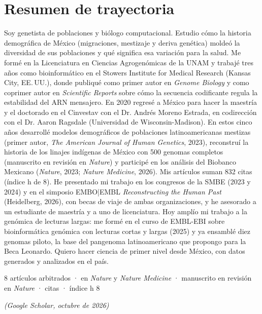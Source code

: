 \documentclass[11pt,letterpaper]{article}
\begin{document}
\section*{Resumen de trayectoria}
\begin{resumen}
Soy genetista de poblaciones y biólogo computacional. Estudio cómo la historia demográfica de México (migraciones, mestizaje y deriva genética) moldeó la diversidad de sus poblaciones y qué significa esa variación para la salud. Me formé en la Licenciatura en Ciencias Agrogenómicas de la UNAM y trabajé tres años como bioinformático en el Stowers Institute for Medical Research (Kansas City, EE.\,UU.), donde publiqué como primer autor en \textit{Genome Biology} y como coprimer autor en \textit{Scientific Reports} sobre cómo la secuencia codificante regula la estabilidad del ARN mensajero. En 2020 regresé a México para hacer la maestría y el doctorado en el Cinvestav con el Dr. Andrés Moreno Estrada, en codirección con el Dr. Aaron Ragsdale (Universidad de Wisconsin-Madison). En estos cinco años desarrollé modelos demográficos de poblaciones latinoamericanas mestizas (primer autor, \textit{The American Journal of Human Genetics}, 2023), reconstruí la historia de los linajes indígenas de México con 500 genomas completos (manuscrito en revisión en \textit{Nature}) y participé en los análisis del Biobanco Mexicano (\textit{Nature}, 2023; \textit{Nature Medicine}, 2026). Mis artículos suman 832 citas (índice h de 8). He presentado mi trabajo en los congresos de la SMBE (2023 y 2024) y en el simposio EMBO|EMBL \textit{Reconstructing the Human Past} (Heidelberg, 2026), con becas de viaje de ambas organizaciones, y he asesorado a un estudiante de maestría y a uno de licenciatura. Hoy amplío mi trabajo a la genómica de lecturas largas: me formé en el curso de EMBL-EBI sobre bioinformática genómica con lecturas cortas y largas (2025) y ya ensamblé diez genomas piloto, la base del pangenoma latinoamericano que propongo para la Beca Leonardo. Quiero hacer ciencia de primer nivel desde México, con datos generados y analizados en el país.
\end{resumen}

{\centering\small\color{Accent}
8 artículos arbitrados \;· en \textit{Nature} y \textit{Nature Medicine} \;· manuscrito en revisión en \textit{Nature} \;· citas \;·\; índice h 8\par}
{\centering\scriptsize\itshape (Google Scholar, octubre de 2026)\par}
\end{document}
